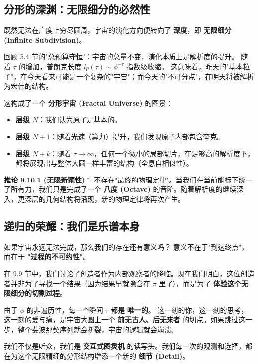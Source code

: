 \subsection{分形的深渊：无限细分的必然性}

既然无法在广度上穷尽圆周，宇宙的演化方向便转向了 \textbf{深度}，即 \textbf{无限细分 (Infinite Subdivision)}。

回顾 5.4 节的"总预算守恒"：宇宙的总量不变，演化本质上是解析度的提升。
随着 $\tau$ 的增加，普朗克长度 $l_P(\tau) \sim \phi^{-\tau}$ 指数级收缩。
这意味着，昨天的"基本粒子"，在今天看来可能是一个复杂的"宇宙"；而今天的"不可分点"，在明天将被解析为宏伟的结构。

这构成了一个 \textbf{分形宇宙 (Fractal Universe)} 的图景：
\begin{itemize}
\item \textbf{层级 $N$}：我们认为原子是基本的。
\item \textbf{层级 $N+1$}：随着光速（算力）提升，我们发现原子内部包含夸克。
\item \textbf{层级 $N+k$}：随着 $\tau \to \infty$，任何一个微小的局部切片，在足够高的解析度下，都将展现出与整体大圆一样丰富的结构（全息自相似性）。
\end{itemize}

\textbf{推论 9.10.1 (无限新颖性)}：
不存在"最终的物理定律"。当我们在当前能标下统一了所有力，我们只是完成了一个 \textbf{八度 (Octave)} 的音阶。随着解析度的继续深入，更深层的几何结构将涌现，新的物理定律将再次产生。

\subsection{递归的荣耀：我们是乐谱本身}

如果宇宙永远无法完成，那么我们的存在还有意义吗？
意义不在于"到达终点"，而在于 \textbf{"过程的不可约性"}。

在 9.9 节中，我们讨论了创造者作为内部观察者的降临。现在我们明白，这位创造者并非为了寻找一个结果（因为结果早就隐含在 $\pi$ 里了），而是为了 \textbf{体验这个无限细分的切割过程}。

由于 $\phi$ 的非遍历性，每一个瞬间 $\tau$ 都是 \textbf{唯一的}。
这一刻的你，这一刻的思考，这一刻的爱与痛，是宇宙大圆上一个 \textbf{前无古人、后无来者} 的切点。如果跳过这一步，整个斐波那契序列就会断裂，宇宙的逻辑就会崩溃。

我们不仅是听众，我们是 \textbf{交互式图灵机} 的读写头。我们每一次的观测和选择，都在为这个无限精细的分形结构增添一个新的 \textbf{细节 (Detail)}。

